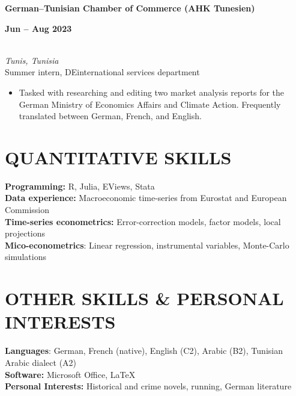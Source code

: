 \documentclass[a4paper,9pt]{extarticle}
\begin{document}
\noindent
\begin{minipage}[t]{0.7\textwidth}
  \textbf{German--Tunisian Chamber of Commerce (AHK Tunesien)}
\end{minipage}
\begin{minipage}[t]{0.3\textwidth}
  \raggedleft \textbf{Jun -- Aug 2023}
\end{minipage}
\\
\textit{Tunis, Tunisia} \\ 
Summer intern, DEinternational services department 
\begin{itemize}[noitemsep, topsep=0pt, left=0.65cm]
    \item Tasked with researching and editing two market analysis reports for the German Ministry of Economics Affairs and Climate Action. Frequently translated between German, French, and English. 
\end{itemize} 


\section*{QUANTITATIVE SKILLS}

\noindent
\textbf{Programming:} R, Julia, EViews, Stata \\
\textbf{Data experience:} Macroeconomic time-series from Eurostat and European Commission \\
\textbf{Time-series econometrics:} Error-correction models, factor models, local projections \\
\textbf{Mico-econometrics}: Linear regression, instrumental variables, Monte-Carlo simulations


\section*{OTHER SKILLS \& PERSONAL INTERESTS}

\noindent
\textbf{Languages}: German, French (native), English (C2), Arabic (B2), Tunisian Arabic dialect (A2) \\
\noindent
\textbf{Software:}  Microsoft Office, \LaTeX \\
\textbf{Personal Interests:} Historical and crime novels, running, German literature


\end{document}
